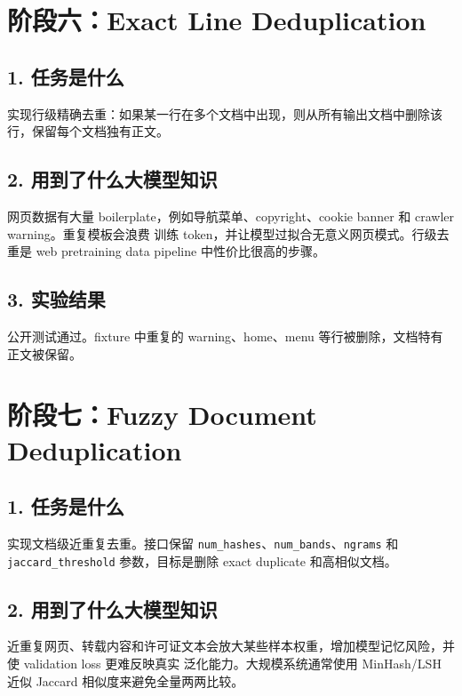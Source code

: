 \documentclass[UTF8,11pt]{ctexart}
\begin{document}
\section{阶段六：Exact Line Deduplication}

\subsection*{1. 任务是什么}

实现行级精确去重：如果某一行在多个文档中出现，则从所有输出文档中删除该行，保留每个文档独有正文。

\subsection*{2. 用到了什么大模型知识}

网页数据有大量 boilerplate，例如导航菜单、copyright、cookie banner 和 crawler warning。重复模板会浪费
训练 token，并让模型过拟合无意义网页模式。行级去重是 web pretraining data pipeline 中性价比很高的步骤。

\subsection*{3. 实验结果}

公开测试通过。fixture 中重复的 warning、home、menu 等行被删除，文档特有正文被保留。

\section{阶段七：Fuzzy Document Deduplication}

\subsection*{1. 任务是什么}

实现文档级近重复去重。接口保留 \texttt{num\_hashes}、\texttt{num\_bands}、\texttt{ngrams} 和
\texttt{jaccard\_threshold} 参数，目标是删除 exact duplicate 和高相似文档。

\subsection*{2. 用到了什么大模型知识}

近重复网页、转载内容和许可证文本会放大某些样本权重，增加模型记忆风险，并使 validation loss 更难反映真实
泛化能力。大规模系统通常使用 MinHash/LSH 近似 Jaccard 相似度来避免全量两两比较。
\end{document}
